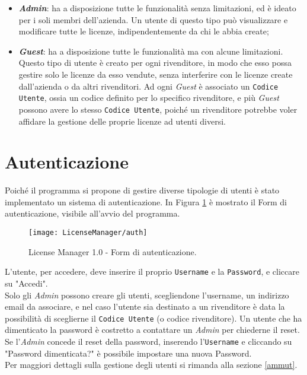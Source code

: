 \begin{itemize}
\item \textbf{\textit{Admin}}: ha a disposizione tutte le funzionalità senza limitazioni, ed è ideato per i soli membri dell’azienda. Un utente di questo tipo può visualizzare e modificare tutte le licenze, indipendentemente da chi le abbia create;

\item \textbf{\textit{Guest}}: ha a disposizione tutte le funzionalità ma con alcune limitazioni. Questo tipo di utente è creato per ogni rivenditore, in modo che esso possa gestire solo le licenze da esso vendute, senza interferire con le licenze create dall’azienda o da altri rivenditori. Ad ogni \textit{Guest} è associato un \texttt{Codice Utente}, ossia un codice definito per lo specifico rivenditore, e più \textit{Guest} possono avere lo stesso \texttt{Codice Utente}, poiché un rivenditore potrebbe voler affidare la gestione delle proprie licenze ad utenti diversi.
\end{itemize}


\section{Autenticazione}
Poiché il programma si propone di gestire diverse tipologie di utenti è stato implementato un sistema di autenticazione. In Figura \ref{auth} è mostrato il Form di autenticazione, visibile all'avvio del programma.

\begin{figure}[!h] 
    \centering 
    \texttt{[image: LicenseManager/auth]} 
    \caption{License Manager 1.0 - Form di autenticazione.}
    \label{auth}
\end{figure}

L’utente, per accedere, deve inserire il proprio \texttt{Username} e la \texttt{Password}, e cliccare su "Accedi".\\
Solo gli \textit{Admin} possono creare gli utenti, scegliendone l’username, un indirizzo email da associare, e nel caso l’utente sia destinato a un rivenditore è data la possibilità di sceglierne il \texttt{Codice Utente} (o codice rivenditore).
Un utente che ha dimenticato la password è costretto a contattare un \textit{Admin} per chiederne il reset. Se l’\textit{Admin} concede il reset della password, inserendo l’\texttt{Username} e cliccando su "Password dimenticata?" è possibile impostare una nuova Password.\\
Per maggiori dettagli sulla gestione degli utenti si rimanda alla sezione \ref{ammut}.
\newpage


